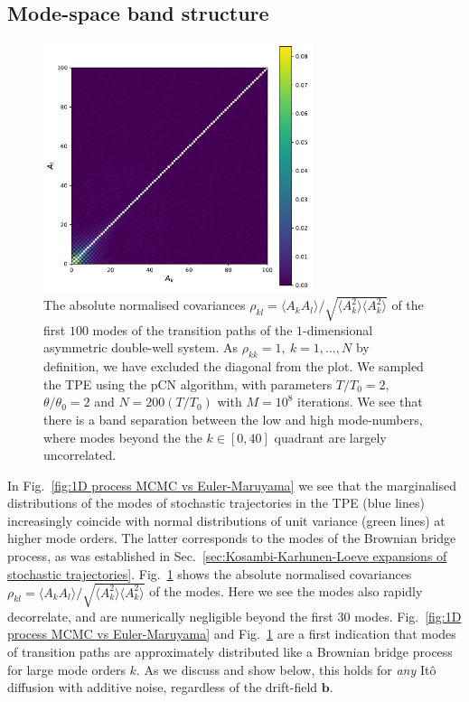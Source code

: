 \subsection{Mode-space band structure} \label{sec:Mode-space band structure}

\begin{figure}[t]
\includegraphics[width=0.7\textwidth]{figs_part1/mcmc/1D_process_covariances}
\centering \caption{The absolute normalised covariances $\rho_{kl} = \langle A_k A_l \rangle / \sqrt{ \langle A_k^2 \rangle \langle A_k^2 \rangle }$ of the first $100$ modes of the transition paths of the $1$-dimensional asymmetric double-well system. As $\rho_{kk} = 1,\ k=1,\dots,N$ by definition, we have excluded the diagonal from the plot. We sampled the TPE using the pCN algorithm, with parameters $T/T_0 = 2$, $\theta/\theta_0 = 2$ and $N = 200(T/T_0)$ with $M=10^8$ iterations. We see that there is a band separation between the low and high mode-numbers, where modes beyond the the $k \in [0, 40]$ quadrant are largely uncorrelated.}
\label{fig:1D process covariance} 
\end{figure}

In Fig.~\ref{fig:1D process MCMC vs Euler-Maruyama} we see that the marginalised distributions of the modes of stochastic trajectories in the TPE (blue lines) increasingly coincide with normal distributions of unit variance (green lines) at higher mode orders. The latter corresponds to the modes of the Brownian bridge process, as was established in Sec.~\ref{sec:Kosambi-Karhunen-Loeve expansions of stochastic trajectories}. Fig.~\ref{fig:1D process covariance} shows the absolute normalised covariances $\rho_{kl} = \langle A_k A_l \rangle / \sqrt{ \langle A_k^2 \rangle \langle A_k^2 \rangle }$ of the modes. Here we see the modes also rapidly decorrelate, and are numerically negligible beyond the first $30$ modes. Fig.~\ref{fig:1D process MCMC vs Euler-Maruyama} and Fig.~\ref{fig:1D process covariance} are a first indication that modes of transition paths are approximately distributed like a Brownian bridge process for large mode orders $k$. As we discuss and show below, this holds for \textit{any} It\^{o} diffusion with additive noise, regardless of the drift-field $\mathbf{b}$.

